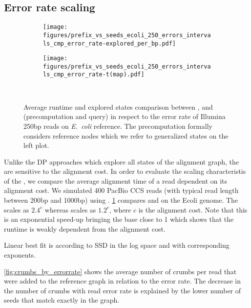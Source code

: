 \subsection{Error rate scaling}
\begin{figure}[t]
  \begin{subfigure}{.49\textwidth}
    \centering
    \texttt{[image: figures/prefix\_vs\_seeds\_ecoli\_250\_errors\_intervals\_cmp\_error\_rate-explored\_per\_bp.pdf]}
  \end{subfigure}%
  \begin{subfigure}{.45\textwidth}
    \centering
    \texttt{[image: figures/prefix\_vs\_seeds\_ecoli\_250\_errors\_intervals\_cmp\_error\_rate-t(map).pdf]}
  \end{subfigure}~\hspace{1em} \caption{Average runtime and explored states
  comparison between \dijkstra, \prefixh and \seedh (precomputation and query)
  in respect to the error rate of Illumina 250bp reads on \textit{E.~coli}
  reference. The \seedh precomputation formally considers reference nodes which
  we refer to generalized states on the left plot. }
  \label{fig:scaling_with_errorrate}
\end{figure}

Unlike the DP approaches which explore all states of the alignment graph, the \A
are sensitive to the alignment cost. In order to evaluate the scaling
characteristis of the \seedh, we compare the average alignment time of a read
dependent on its alignment cost. We simulated 400 PacBio CCS reads (with typical
read length between 200bp and 1000bp) using \randomreads.
\cref{fig:scaling_with_errorrate} compares \seedh and \prefixh on the Ecoli
genome. The \prefixh scales as $2.4^c$ whereas \seedh scales as $1.2^c$, where
$c$ is the alignment cost. Note that this is an exponential speed-up bringing
the base close to 1 which shows that the runtime is weakly dependent from the
alignment cost.

Linear best fit is according to SSD in the log space and with corresponding exponents.

\cref{fig:crumbs_by_errorrate} shows the average number of crumbs per read that
were added to the reference graph in relation to the error rate. The decrease in
the number of crumbs with read error rate is explained by the lower number of
seeds that match exactly in the graph.